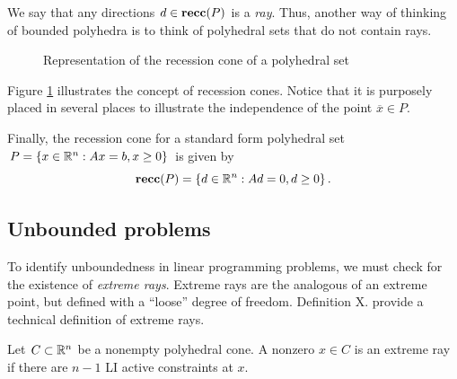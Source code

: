 We say that any directions $d \in {\bf recc}(P)$ is a \emph{ray}. Thus, another way of thinking of bounded polyhedra is to think of polyhedral sets that do not contain rays. 

\begin{figure}
	\caption{Representation of the recession cone of a polyhedral set} \label{p1c6:fig:recession_cone}	
\end{figure}

Figure \ref{p1c6:fig:recession_cone} illustrates the concept of recession cones. Notice that it is purposely placed in several places to illustrate the independence of the point $\overline{x} \in P$.

Finally, the recession cone for a standard form polyhedral set $P = \left\{ x \in \mathbb{R}^n : Ax = b, x \geq 0 \right \}$ is given by 
%
\begin{equation*}
	{\bf recc}(P) = \left\{ d \in \mathbb{R}^n : Ad = 0, d \geq 0 \right \}.	
\end{equation*} 


\subsection{Unbounded problems}

To identify unboundedness in linear programming problems, we must check for the existence of \emph{extreme rays}. Extreme rays are the analogous of an extreme point, but defined with a ``loose'' degree of freedom. Definition X. provide a technical definition of extreme rays.

\begin{definition} \label{p1c6:def:extreme_ray}
	Let $C \subset \mathbb{R}^n$ be a nonempty polyhedral cone. A nonzero $x \in C$ is an extreme ray if there are $n-1$ LI active constraints at $x$.
\end{definition} 

